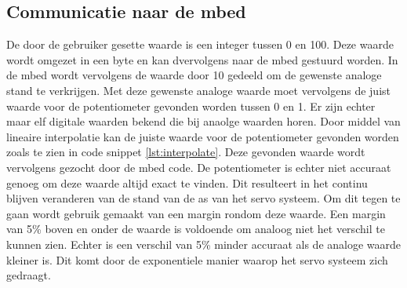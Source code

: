 \documentclass[a4paper]{article}
\begin{document}
		\subsection{Communicatie naar de mbed}
			De door de gebruiker gesette waarde is een integer tussen 0 en 100. Deze waarde wordt omgezet in een byte en kan dvervolgens naar de mbed gestuurd worden. In de mbed wordt vervolgens de waarde door 10 gedeeld om de gewenste analoge stand te verkrijgen. Met deze gewenste analoge waarde moet vervolgens de juist waarde voor de potentiometer gevonden worden tussen 0 en 1. Er zijn echter maar elf digitale waarden bekend die bij anaolge waarden horen. Door middel van lineaire interpolatie kan de juiste waarde voor de potentiometer gevonden worden zoals te zien in code snippet \ref{lst:interpolate}. Deze gevonden waarde wordt vervolgens gezocht door de mbed code. 
De potentiometer is echter niet accuraat genoeg om deze waarde altijd exact te vinden. Dit resulteert in het continu blijven veranderen van de stand van de as van het servo systeem. Om dit tegen te gaan wordt gebruik gemaakt van een margin rondom deze waarde. Een margin van 5\% boven en onder de waarde is voldoende om analoog niet het verschil te kunnen zien. Echter is een verschil van 5\% minder accuraat als de analoge waarde kleiner is. Dit komt door de exponentiele manier waarop het servo systeem zich gedraagt.
\end{document}
